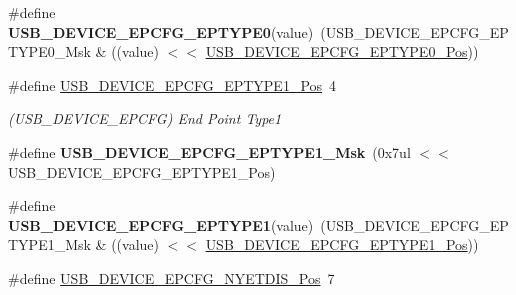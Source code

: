 \begin{DoxyCompactItemize}
\item 
\hypertarget{group___s_a_m_l21___u_s_b_gacff6571e740710538bec04061a269e89}{}\#define {\bfseries U\+S\+B\+\_\+\+D\+E\+V\+I\+C\+E\+\_\+\+E\+P\+C\+F\+G\+\_\+\+E\+P\+T\+Y\+P\+E0}(value)~(U\+S\+B\+\_\+\+D\+E\+V\+I\+C\+E\+\_\+\+E\+P\+C\+F\+G\+\_\+\+E\+P\+T\+Y\+P\+E0\+\_\+\+Msk \& ((value) $<$$<$ \hyperlink{group___s_a_m_l21___u_s_b_ga28367740a0b3944537370790bebe7fa1}{U\+S\+B\+\_\+\+D\+E\+V\+I\+C\+E\+\_\+\+E\+P\+C\+F\+G\+\_\+\+E\+P\+T\+Y\+P\+E0\+\_\+\+Pos}))\label{group___s_a_m_l21___u_s_b_gacff6571e740710538bec04061a269e89}

\item 
\hypertarget{group___s_a_m_l21___u_s_b_ga06ca795ee6719bf794d17d0128492641}{}\#define \hyperlink{group___s_a_m_l21___u_s_b_ga06ca795ee6719bf794d17d0128492641}{U\+S\+B\+\_\+\+D\+E\+V\+I\+C\+E\+\_\+\+E\+P\+C\+F\+G\+\_\+\+E\+P\+T\+Y\+P\+E1\+\_\+\+Pos}~4\label{group___s_a_m_l21___u_s_b_ga06ca795ee6719bf794d17d0128492641}

\begin{DoxyCompactList}\small\item\em (U\+S\+B\+\_\+\+D\+E\+V\+I\+C\+E\+\_\+\+E\+P\+C\+F\+G) End Point Type1 \end{DoxyCompactList}\item 
\hypertarget{group___s_a_m_l21___u_s_b_ga7412df80005a725cabc460437769d9e7}{}\#define {\bfseries U\+S\+B\+\_\+\+D\+E\+V\+I\+C\+E\+\_\+\+E\+P\+C\+F\+G\+\_\+\+E\+P\+T\+Y\+P\+E1\+\_\+\+Msk}~(0x7ul $<$$<$ U\+S\+B\+\_\+\+D\+E\+V\+I\+C\+E\+\_\+\+E\+P\+C\+F\+G\+\_\+\+E\+P\+T\+Y\+P\+E1\+\_\+\+Pos)\label{group___s_a_m_l21___u_s_b_ga7412df80005a725cabc460437769d9e7}

\item 
\hypertarget{group___s_a_m_l21___u_s_b_ga38a7672d1f534098bc4ef4d35c5d686c}{}\#define {\bfseries U\+S\+B\+\_\+\+D\+E\+V\+I\+C\+E\+\_\+\+E\+P\+C\+F\+G\+\_\+\+E\+P\+T\+Y\+P\+E1}(value)~(U\+S\+B\+\_\+\+D\+E\+V\+I\+C\+E\+\_\+\+E\+P\+C\+F\+G\+\_\+\+E\+P\+T\+Y\+P\+E1\+\_\+\+Msk \& ((value) $<$$<$ \hyperlink{group___s_a_m_l21___u_s_b_ga06ca795ee6719bf794d17d0128492641}{U\+S\+B\+\_\+\+D\+E\+V\+I\+C\+E\+\_\+\+E\+P\+C\+F\+G\+\_\+\+E\+P\+T\+Y\+P\+E1\+\_\+\+Pos}))\label{group___s_a_m_l21___u_s_b_ga38a7672d1f534098bc4ef4d35c5d686c}

\item 
\hypertarget{group___s_a_m_l21___u_s_b_ga307ba7e6a8adf340d8c9b713d8301f7b}{}\#define \hyperlink{group___s_a_m_l21___u_s_b_ga307ba7e6a8adf340d8c9b713d8301f7b}{U\+S\+B\+\_\+\+D\+E\+V\+I\+C\+E\+\_\+\+E\+P\+C\+F\+G\+\_\+\+N\+Y\+E\+T\+D\+I\+S\+\_\+\+Pos}~7\label{group___s_a_m_l21___u_s_b_ga307ba7e6a8adf340d8c9b713d8301f7b}


\end{DoxyCompactItemize}
